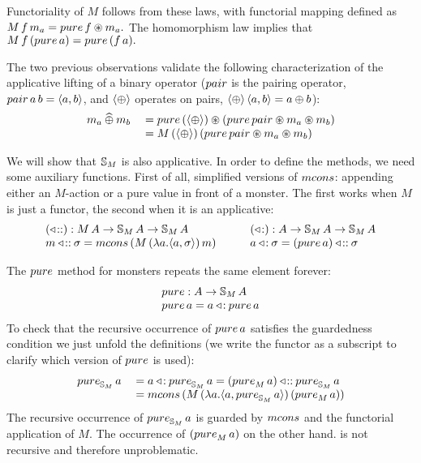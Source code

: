 Functoriality of $M$ follows from these laws, with functorial mapping defined as
$
M\,f\,m_a = \apure\,f \appl m_a.
$
The homomorphism law implies that
$
M\,f\,(\apure\,a) = \apure\,(f\,a).
$

The two previous observations validate the following characterization of the applicative lifting of a binary operator
 ($\pairing$ is the pairing operator, $\pairing\,a\,b = \pair{a}{b}$, and $\mathbin{\langle {\oplus} \rangle}$ operates on pairs, $\mathbin{\langle {\oplus} \rangle}\,\langle a, b \rangle = a \oplus b$):
$$
\begin{array}{rl}
m_a \alift{\oplus} m_b 
& {} = \apure\,(\pairop{\oplus}) \appl (\apure\,\pairing\appl m_a\appl m_b) \\
& {}= M\,(\pairop{\oplus})\,(\apure\,\pairing\appl m_a\appl m_b)
\end{array}
$$

We will show that $\mathbb{S}_{M}$ is also applicative.
In order to define the methods, we need some auxiliary functions.
First of all, simplified versions of $\mcons$: appending either an $M$-action or a pure value in front of a monster.
The first works when $M$ is just a functor, the second when it is an applicative:
$$
\begin{array}{l}
(\fcons): M\,A \rightarrow \stream{M}\,A \rightarrow \stream{M}\,A\\
m \fcons \sigma = \mcons\, (M\,(\lambda a. \langle a, \sigma\rangle)\,m)
\end{array}\qquad
\begin{array}{l}
(\acons): A \rightarrow \stream{M}\,A \rightarrow \stream{M}\,A\\
a \acons \sigma = (\apure\, a) \fcons \sigma
\end{array}
$$

The $\apure$ method for monsters repeats the same element forever:
$$
\begin{array}{l}
\apure : A \rightarrow \stream{M}\,A\\
\apure\,a = a \acons \apure\,a
\end{array}
$$
To check that the recursive occurrence of $\apure\,a$ satisfies the guardedness condition we just unfold the definitions (we write the functor as a subscript to clarify which version of $\apure$ is used):
$$
\begin{array}{ll}
\apure_{\stream{M}}\,a 
& {} = a \acons \apure_{\stream{M}}\,a 
     = (\apure_M\, a) \fcons \apure_{\stream{M}}\,a \\
& {} = \mcons\, (M\,(\lambda a. \langle a, \apure_{\stream{M}}\,a \rangle)\, (\apure_M\, a))
\end{array}
$$
The recursive occurrence of $\apure_{\stream{M}}\,a$ is guarded by $\mcons$ and the functorial application of $M$.
The occurrence of $(\apure_M\, a)$ on the other hand. is not recursive and therefore unproblematic.

